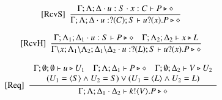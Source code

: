 \begin{figure}[t]
\[\begin{array}{c}
		\trule{RcvS}~~\tree{
		\Gamma; \Lambda; \Delta \cat u: S \cat x: C \proves P \hastype \Proc
		}{
			\Gamma; \Lambda; \Delta \cat u: \btinp{C} S \vdash \binp{u}{{x}} P \hastype \Proc
		}
\\[6mm]
		\trule{RcvH}~~\tree{
			\Gamma; \Lambda_1; \Delta_1 \cat u: S \proves P \hastype \Proc
			\quad
			\Gamma; \Lambda_2; \Delta_2 \proves x \hastype L
		}{
			\Gamma \backslash x; \Lambda_1\backslash\Lambda_2; \Delta_1 \backslash \Delta_2 \cat u: \btinp{L} S \proves \binp{u}{x} P \hastype \Proc
		}
		\\[6mm]


		\trule{Req}~~\tree{
			\begin{array}{c}
				\Gamma; \es; \es \proves u \hastype U_1
				\quad
				\Gamma; \Lambda; \Delta_1 \proves P \hastype \Proc
				\quad
				\Gamma; \es; \Delta_2 \proves V \hastype U_2
				\\
				(U_1 = \chtype{S} 
                                \land %
                                U_2 = S)
				\lor
				 (U_1 = \chtype{L} 
                                \land %
                                 U_2 = L)
			\end{array}
		}{
			\Gamma; \Lambda; \Delta_1 \cat \Delta_2 \proves \bout{k}{V} P \hastype \Proc
		}
		\\[6mm]



\end{array}\]
\end{figure}
